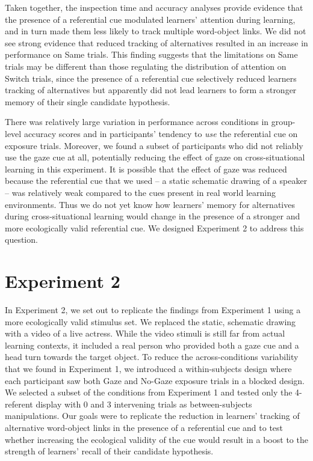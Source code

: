 \documentclass[authoryear, review]{elsarticle}
\begin{document}
Taken together, the inspection time and accuracy analyses provide
evidence that the presence of a referential cue modulated learners'
attention during learning, and in turn made them less likely to track
multiple word-object links. We did not see strong evidence that reduced
tracking of alternatives resulted in an increase in performance on Same
trials. This finding suggests that the limitations on Same trials may be
different than those regulating the distribution of attention on Switch
trials, since the presence of a referential cue selectively reduced
learners tracking of alternatives but apparently did not lead learners
to form a stronger memory of their single candidate hypothesis.

There was relatively large variation in performance across conditions in
group-level accuracy scores and in participants' tendency to \emph{use}
the referential cue on exposure trials. Moreover, we found a subset of
participants who did not reliably use the gaze cue at all, potentially
reducing the effect of gaze on cross-situational learning in this
experiment. It is possible that the effect of gaze was reduced because
the referential cue that we used -- a static schematic drawing of a
speaker -- was relatively weak compared to the cues present in real
world learning environments. Thus we do not yet know how learners'
memory for alternatives during cross-situational learning would change
in the presence of a stronger and more ecologically valid referential
cue. We designed Experiment 2 to address this question.

\section{Experiment 2}\label{experiment-2}

In Experiment 2, we set out to replicate the findings from Experiment 1
using a more ecologically valid stimulus set. We replaced the static,
schematic drawing with a video of a live actress. While the video
stimuli is still far from actual learning contexts, it included a real
person who provided both a gaze cue and a head turn towards the target
object. To reduce the across-conditions variability that we found in
Experiment 1, we introduced a within-subjects design where each
participant saw both Gaze and No-Gaze exposure trials in a blocked
design. We selected a subset of the conditions from Experiment 1 and
tested only the 4-referent display with 0 and 3 intervening trials as
between-subjects manipulations. Our goals were to replicate the
reduction in learners' tracking of alternative word-object links in the
presence of a referential cue and to test whether increasing the
ecological validity of the cue would result in a boost to the strength
of learners' recall of their candidate hypothesis.
\end{document}
